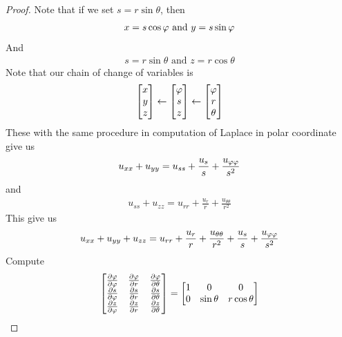 \documentclass{report}
\begin{document}
\begin{proof}
Note that if we set $s=r \sin \theta$, then 
\begin{align*}
x=s \cos \pfi \text{ and }y= s \sin \pfi 
\end{align*}
And 
\begin{align*}
s=r \sin \theta \text{ and }z= r \cos \theta
\end{align*}
Note that our chain of change of variables is 
\begin{align*}
\begin{bmatrix}
x \\
y\\
z
\end{bmatrix} \leftarrow \begin{bmatrix}
\pfi\\
s\\
z
\end{bmatrix} \leftarrow  \begin{bmatrix}
\pfi \\
r \\
\theta 
\end{bmatrix}
\end{align*}
These with the same procedure in computation of Laplace in polar coordinate give us 
\begin{align*}
u_{xx}+ u_{yy}= u_{ss}+ \frac{u_s}{s} + \frac{u_{\pfi \pfi}}{s^2} 
\end{align*}
and 
\begin{align*}
u_{ss}+ u_{zz}= u_{rr}+ \frac{u_r}{r}+ \frac{u_{\theta \theta}}{r^2}
\end{align*}
This give us 
\begin{align*}
u_{xx}+u_{yy}+u_{zz}= u_{rr}+ \frac{u_r}{r}+ \frac{u_{\theta \theta}}{r^2} + \frac{u_s}{s}+ \frac{u_{\pfi \pfi}}{s^2} 
\end{align*}
Compute 
\begin{align*}
 \begin{bmatrix}
   \frac{\partial \pfi}{\partial \pfi} & \frac{\partial \pfi}{\partial r} & \frac{\partial \pfi}{\partial \theta} \\
   \frac{\partial s}{\partial \pfi} & \frac{\partial s}{\partial r} & \frac{\partial s}{\partial \theta} \\
   \frac{\partial z}{\partial \pfi} & \frac{\partial z}{\partial r} & \frac{\partial z}{\partial \theta} 
 \end{bmatrix} =\begin{bmatrix}
   1 & 0 & 0 \\
   0 & \sin \theta & r \cos \theta \\

\end{bmatrix}
\end{align*}
\end{proof}
\end{document}
